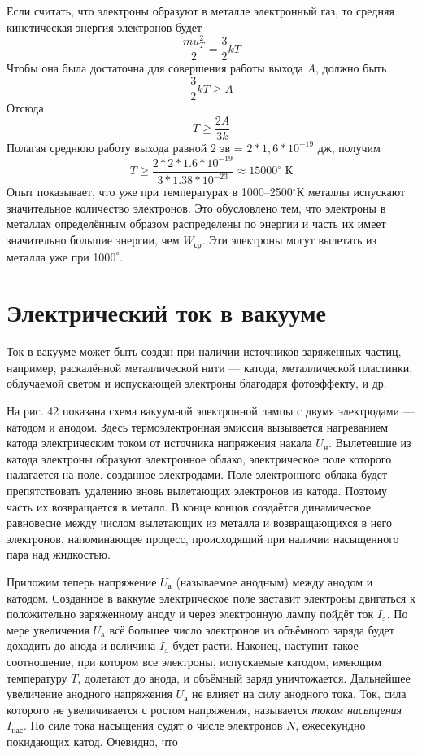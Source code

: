 \documentclass[a4paper,10pt]{book}
\begin{document}
Если считать, что электроны образуют в металле электронный газ, то средняя кинетическая энергия электронов будет
\begin{equation}
\frac{mu_T^2}{2} = \frac{3}{2}kT\nonumber
\end{equation}
Чтобы она была достаточна для совершения работы выхода $A$, должно быть
\begin{equation}\label{lecture20_1}
\frac{3}{2}kT \geq A
\end{equation}
Отсюда
\begin{equation}
T \geq \frac{2A}{3k}\nonumber
\end{equation}
Полагая среднюю работу выхода равной $2 \text{ эв}$ = $2*1,6 * 10^{-19} \text{ дж}$, получим
\begin{equation}
T \geq \frac{2*2*1.6*10^{-19}}{3*1.38*10^{-23}}\approx 15 000^{\circ}\text{ К}\nonumber
\end{equation}
Опыт показывает, что уже при температурах в 1000–2500$^{\circ}$К металлы испускают значительное количество электронов. Это обусловлено тем, что электроны в металлах определённым образом распределены по энергии и часть их имеет значительно большие энергии, чем $W_\text{ср}$. Эти электроны могут вылетать из металла уже при 100$0^{\circ}$.

\section{Электрический ток в вакууме}
Ток в вакууме может быть создан при наличии источников заряженных частиц, например, раскалённой металлической нити — катода, металлической пластинки, облучаемой светом и испускающей электроны благодаря фотоэффекту, и др.

На рис. 42 показана схема вакуумной электронной лампы с двумя электродами — катодом и анодом. Здесь термоэлектронная эмиссия вызывается нагреванием катода электрическим током от источника напряжения накала $U_\text{н}$. Вылетевшие из катода электроны образуют электронное облако, электрическое поле которого налагается на поле, созданное электродами. Поле электронного облака будет препятствовать удалению вновь вылетающих электронов из катода. Поэтому часть их возвращается в металл. В конце концов создаётся динамическое равновесие между числом вылетающих из металла и возвращающихся в него электронов, напоминающее процесс, происходящий при наличии насыщенного пара над жидкостью.

Приложим теперь напряжение $U_\text{а}$ (называемое анодным) между анодом и катодом. Созданное в ваккуме электрическое поле заставит электроны двигаться к положительно заряженному аноду и через электронную лампу пойдёт ток $I_\text{a}$. По мере увеличения $U_\text{a}$ всё большее число электронов из объёмного заряда будет доходить до анода и величина $I_\text{a}$ будет расти. Наконец, наступит такое соотношение, при котором все электроны, испускаемые катодом, имеющим температуру $T$, долетают до анода, и объёмный заряд уничтожается. Дальнейшее увеличение анодного напряжения $U_\text{а}$ не влияет на силу анодного тока. Ток, сила которого не увеличивается с ростом напряжения, называется \emph{током насыщения} $I_\text{нас}$. По силе тока насыщения судят о числе электронов $N$, ежесекундно покидающих катод. Очевидно, что
\end{document}
